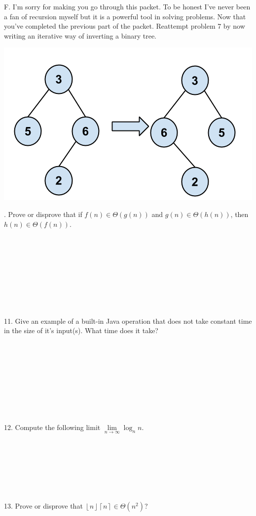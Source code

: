 \documentclass[12pt]{article}
\newcommand{\floor}[1]{\left\lfloor #1 \right\rfloor}
\newcommand{\ceil}[1]{\left\lceil #1 \right\rceil}
\begin{document}
\newpage
\noindent F. I'm sorry for making you go through this packet. To be honest I've never been a fan of recursion myself but it is a powerful tool in solving problems. Now that you've completed the previous part of the packet. Reattempt problem 7 by now writing an iterative way of inverting a binary tree.
\centerline{\includegraphics[scale = 0.4]{invertbtree.png}}
\newpage 
{}. Prove or disprove that if $f(n) \in \Theta(g(n))$ and $g(n) \in \Theta(h(n))$, then $h(n) \in \Theta(f(n))$.\\\\\\\\\\\\\\\\\\\\
11. Give an example of a built-in Java operation that does not take constant time in the size of it's input(s). What time does it take?\\\\\\\\\\\\\\\\\\\\
12. Compute the following limit $\lim\limits_{n\to\infty}\log_{n}{n}$.\\\\\\\\\\\\\\\\
13. Prove or disprove that $\floor{n}\ceil{n} \in \Theta(n^2)$?
\end{document}
